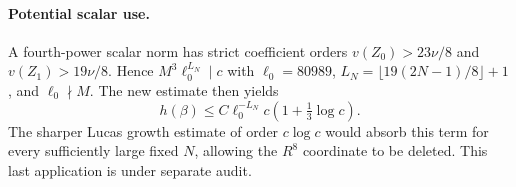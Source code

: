 \documentclass[11pt]{article}
\begin{document}
\paragraph{Potential scalar use.}
A fourth-power scalar norm has strict coefficient orders
$v(Z_0)>23\nu/8$ and $v(Z_1)>19\nu/8$. Hence
$M^3\ell_0^{L_N}\mid c$ with $\ell_0=80989$,
$L_N=\lfloor19(2N-1)/8\rfloor+1$, and $\ell_0\nmid M$.
The new estimate then yields
\[
 h(\beta)\le C\ell_0^{-L_N}c(1+\tfrac13\log c).
\]
The sharper Lucas growth estimate of order $c\log c$ would absorb
this term for every sufficiently large fixed $N$, allowing the
$R^8$ coordinate to be deleted. This last application is under
separate audit.
\end{document}
